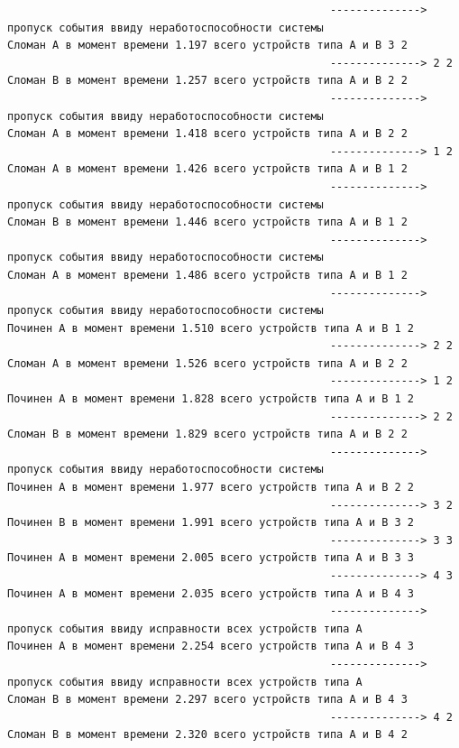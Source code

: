 \begin{verbatim}
                                                  --------------> пропуск события ввиду неработоспособности системы
Сломан A в момент времени 1.197 всего устройств типа А и В 3 2
                                                  --------------> 2 2
Сломан B в момент времени 1.257 всего устройств типа А и В 2 2
                                                  --------------> пропуск события ввиду неработоспособности системы
Сломан A в момент времени 1.418 всего устройств типа А и В 2 2
                                                  --------------> 1 2
Сломан A в момент времени 1.426 всего устройств типа А и В 1 2
                                                  --------------> пропуск события ввиду неработоспособности системы
Сломан B в момент времени 1.446 всего устройств типа А и В 1 2
                                                  --------------> пропуск события ввиду неработоспособности системы
Сломан A в момент времени 1.486 всего устройств типа А и В 1 2
                                                  --------------> пропуск события ввиду неработоспособности системы
Починен A в момент времени 1.510 всего устройств типа А и В 1 2
                                                  --------------> 2 2
Сломан A в момент времени 1.526 всего устройств типа А и В 2 2
                                                  --------------> 1 2
Починен A в момент времени 1.828 всего устройств типа А и В 1 2
                                                  --------------> 2 2
Сломан B в момент времени 1.829 всего устройств типа А и В 2 2
                                                  --------------> пропуск события ввиду неработоспособности системы
Починен A в момент времени 1.977 всего устройств типа А и В 2 2
                                                  --------------> 3 2
Починен B в момент времени 1.991 всего устройств типа А и В 3 2
                                                  --------------> 3 3
Починен A в момент времени 2.005 всего устройств типа А и В 3 3
                                                  --------------> 4 3
Починен A в момент времени 2.035 всего устройств типа А и В 4 3
                                                  --------------> пропуск события ввиду исправности всех устройств типа А
Починен A в момент времени 2.254 всего устройств типа А и В 4 3
                                                  --------------> пропуск события ввиду исправности всех устройств типа А
Сломан B в момент времени 2.297 всего устройств типа А и В 4 3
                                                  --------------> 4 2
Сломан B в момент времени 2.320 всего устройств типа А и В 4 2

\end{verbatim}
